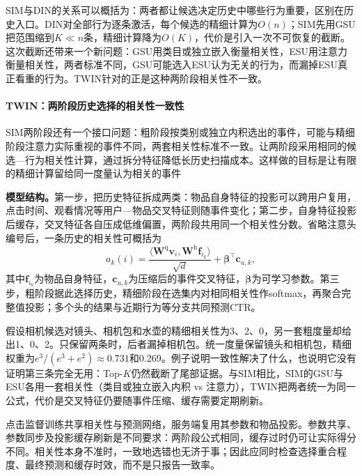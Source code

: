 SIM与DIN的关系可以概括为：两者都让候选决定历史中哪些行为重要，区别在历史入口。DIN对全部行为逐条激活，每个候选的精细计算为$O(n)$；SIM先用GSU把范围缩到$K\ll n$条，精细计算降为$O(K)$，代价是引入一次不可恢复的截断。这次截断还带来一个新问题：GSU用类目或独立嵌入衡量相关性，ESU用注意力衡量相关性，两者标准不同，GSU可能选入ESU认为无关的行为，而漏掉ESU真正看重的行为。TWIN针对的正是这种两阶段相关性不一致。

\paragraph{TWIN：两阶段历史选择的相关性一致性}
\label{sec:rs-twin}

SIM两阶段还有一个接口问题：粗阶段按类别或独立内积选出的事件，可能与精细阶段注意力实际重视的事件不同，两套相关性标准不一致。让两阶段采用相同的候选—行为相关性计算，通过拆分特征降低长历史扫描成本。这样做的目标是让有限的精细计算留给同一度量认为相关的事件

\textbf{模型结构。}第一步，把历史特征拆成两类：物品自身特征的投影可以跨用户复用，点击时间、观看情况等用户—物品交叉特征则随事件变化；第二步，自身特征投影后缓存，交叉特征各自压成低维偏置，两阶段共用同一个相关性分数。省略注意头编号后，一条历史的相关性可概括为
\begin{equation}
  a_k(i)=
  \frac{\langle\bm{W}^{\mathrm{q}}\bm{v}_i,
                 \bm{W}^{\mathrm{h}}\bm{f}_{i_k}\rangle}{\sqrt d}
       +\bm{\beta}^{\top}\bm{c}_{u,k},
  \label{eq:rs-twin-score}
\end{equation}
其中$\bm{f}_{i_k}$为物品自身特征，$\bm{c}_{u,k}$为压缩后的事件交叉特征，$\bm{\beta}$为可学习参数。第三步，粗阶段据此选择历史，精细阶段在选集内对相同相关性作softmax，再聚合完整值投影；多个头的结果与近期行为等分支共同预测CTR。

假设相机候选对镜头、相机包和水壶的精细相关性为3、2、0，另一套粗度量却给出1、0、2。只保留两条时，后者漏掉相机包。统一度量保留镜头和相机包，精细权重为$e^3/(e^3+e^2)\approx0.731$和0.269。例子说明一致性解决了什么，也说明它没有证明第三条完全无用：Top-$K$仍然截断了尾部证据。与SIM相比，SIM的GSU与ESU各用一套相关性（类目或独立嵌入内积 vs 注意力），TWIN把两者统一为同一公式，代价是交叉特征仍要随事件压缩、缓存需要定期刷新。

点击监督训练共享相关性与预测网络，服务端复用其参数和物品投影。参数共享、参数同步及投影缓存刷新是不同要求：两阶段公式相同，缓存过时仍可让实际得分不同。相关性本身不准时，一致地选错也无济于事；因此应同时检查选择重合程度、最终预测和缓存时效，而不是只报告一致率。

